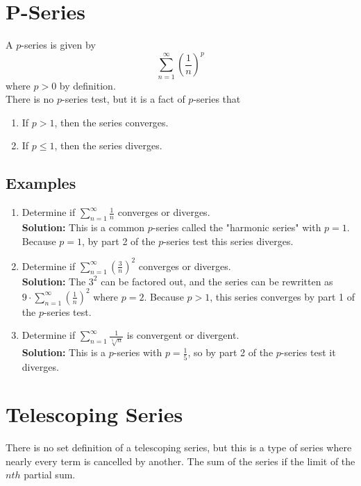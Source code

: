 \documentclass[12pt]{report}
\begin{document}
\section{P-Series}
A $p$-series is given by
	$$\sum_{n=1}^{\infty} \left( \frac{1}{n} \right)^p$$
where $p > 0$ by definition. \\


\noindent There is no $p$-series test, but it is a fact of $p$-series that
\begin{enumerate}
	\item If $p > 1$, then the series converges.
	\item If $p \leq 1$, then the series diverges.
\end{enumerate}

\subsection*{Examples}
\begin{enumerate}
	\item Determine if $\sum_{n=1}^{\infty} \frac{1}{n}$ converges or diverges. \\
	
	\textbf{Solution:} This is a common $p$-series called the "harmonic series" with $p = 1$. Because $p = 1$, by part 2 of the $p$-series test this series diverges.
	
	\item Determine if $\sum_{n=1}^{\infty} \left( \frac{3}{n} \right)^2$ converges or diverges. \\
	
	\textbf{Solution:} The $3^2$ can be factored out, and the series can be rewritten as $9 \cdot \sum_{n=1}^{\infty} \left( \frac{1}{n} \right)^2$ where $p = 2$. Because $p > 1$, this series converges by part 1 of the $p$-series test.
	
	\item Determine if $\sum_{n=1}^{\infty} \frac{1}{\sqrt[5]{n}}$ is convergent or divergent. \\
	
	\textbf{Solution:} This is a $p$-series with $p = \frac{1}{5}$, so by part 2 of the $p$-series test it diverges.
\end{enumerate}


\clearpage


\section{Telescoping Series}
There is no set definition of a telescoping series, but this is a type of series where nearly every term is cancelled by another. The sum of the series if the limit of the $nth$ partial sum. 
\end{document}
